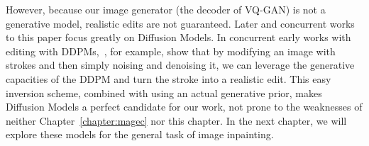  However, because our image generator (the decoder of VQ-GAN) is not a generative model, 
 realistic edits are not guaranteed. Later and concurrent works to this paper focus greatly 
 on Diffusion Models. In concurrent early works with editing with \ac{DDPM}s,~\cite{meng2022sdedit}, 
 for example, show that by modifying an image with strokes and then simply noising and denoising it,
 we can leverage the generative capacities of the \ac{DDPM} and turn the stroke into a realistic edit. 
 This easy inversion scheme, combined with using an actual generative prior, makes Diffusion Models 
 a perfect candidate for our work, not prone to the weaknesses of neither Chapter~\ref{chapter:magec}
 nor this chapter. In the next chapter, we will explore these models for the general task of 
 image inpainting.







